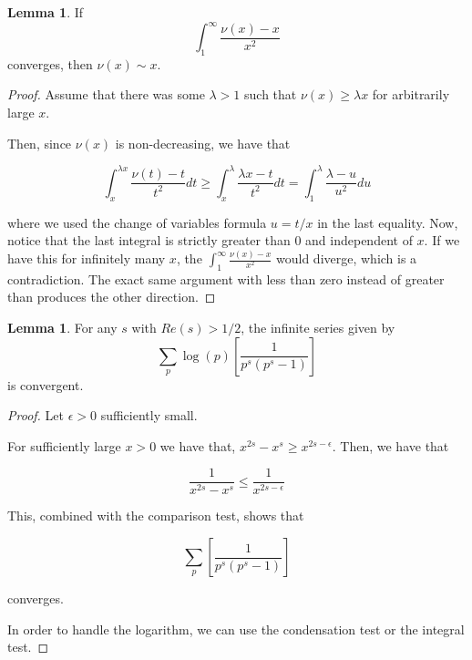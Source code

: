 \documentclass{article}
\theoremstyle{definition}
\newtheorem{lemma}[theorem]{Lemma}
\begin{document}
\begin{lemma}\label{lem:newman_vi}
    If \[ \int_{1}^{\infty} \frac{\nu(x) - x}{x^{2}} \] converges, then $ \nu(x) \sim x $.
\end{lemma}
\begin{proof}
    Assume that there was some $ \lambda > 1 $ such that $ \nu(x) \geq \lambda x $
    for arbitrarily large $ x $.

    Then, since $ \nu(x) $ is non-decreasing, we have that

    \[ \int_{x}^{\lambda x} \frac{\nu(t) - t}{t^{2}} dt \geq \int_{x}^{\lambda}  \frac{\lambda x - t}{t^{2}} dt = \int_{1}^{\lambda} \frac{\lambda - u}{u^{2}} du \] 

    where we used the change of variables formula $ u = t/x $ in the last equality. 
    Now, notice that the last integral is strictly greater than $ 0 $ and independent of $ x $. 
    If we have this for infinitely many $ x $, the $ \int_{1}^{\infty} \frac{\nu(x) - x}{x^{2}} $ would diverge,
    which is a contradiction. The exact same argument with less than zero instead of greater than produces the other direction.
\end{proof}

\begin{lemma}\label{lem:epsilon_convergence_trick_phi}
    For any $ s $ with $ Re(s) > 1/2 $, the infinite series given by 
    \[ \sum_{p} \log(p)[\frac{1}{p^{s}(p^{s} - 1)}] \] 
    is convergent.
\end{lemma}
\begin{proof}
    Let $ \epsilon > 0 $ sufficiently small.

    For sufficiently large $ x > 0 $ we have that, $ x^{2s} - x^{s} \geq x^{2s - \epsilon} $.
    Then, we have that
    
    \[ \frac{1}{x^{2s} - x^{s}} \leq \frac{1}{x^{2s - \epsilon}} \]

    This, combined with the comparison test, shows that 

    \[ \sum_{p} [\frac{1}{p^{s}(p^{s} - 1)}] \] 

    converges.

    In order to handle the logarithm, we can use the condensation test
    or the integral test.
\end{proof}
\end{document}
